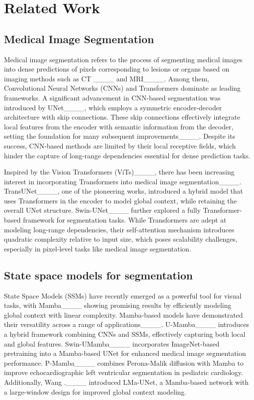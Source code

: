 \section{Related Work}
\subsection{Medical Image Segmentation}
Medical image segmentation refers to the process of segmenting medical images into dense predictions of pixels corresponding to lesions or organs based on imaging methods such as CT ____ and MRI____. Among them, Convolutional Neural Networks (CNNs) and Transformers dominate as leading frameworks. A significant advancement in CNN-based segmentation was introduced by UNet____, which employs a symmetric encoder-decoder architecture with skip connections. These skip connections effectively integrate local features from the encoder with semantic information from the decoder, setting the foundation for many subsequent improvements____. Despite its success, CNN-based methods are limited by their local receptive fields, which hinder the capture of long-range dependencies essential for dense prediction tasks.

Inspired by the Vision Transformers (ViTs)____, there has been increasing interest in incorporating Transformers into medical image segmentation____. TransUNet____, one of the pioneering works, introduced a hybrid model that uses Transformers in the encoder to model global context, while retaining the overall UNet structure. Swin-UNet____ further explored a fully Transformer-based framework for segmentation tasks. While Transformers are adept at modeling long-range dependencies, their self-attention mechanism introduces quadratic complexity relative to input size, which poses scalability challenges, especially in pixel-level tasks like medical image segmentation.

\subsection{State space models for segmentation}
State Space Models (SSMs) have recently emerged as a powerful tool for visual tasks, with Mamba____ showing promising results by efficiently modeling global context with linear complexity. Mamba-based models have demonstrated their versatility across a range of applications____. U-Mamba____ introduces a hybrid framework combining CNNs and SSMs, effectively capturing both local and global features. Swin-UMamba____ incorporates ImageNet-based pretraining into a Mamba-based UNet for enhanced medical image segmentation performance.
P-Mamba____ combines Perona-Malik diffusion with Mamba to improve echocardiographic left ventricular segmentation in pediatric cardiology. Additionally, Wang \etal.____ introduced LMa-UNet, a Mamba-based network with a large-window design for improved global context modeling.


